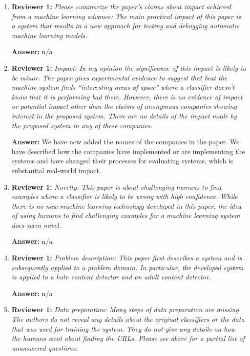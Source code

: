 \documentclass[letterpaper]{article}
\begin{document}
\begin{enumerate}
\item \textbf{Reviewer 1:} \emph{ Please summarize the paper's claims about impact achieved from a machine learning advance: The main practical impact of this paper is a system that results in a new approach for testing and debugging automatic machine learning models.}

\textbf{Answer:} n/a

\item \textbf{Reviewer 1:} \emph{Impact: In my opinion the significance of this impact is likely to be minor. The paper gives experimental evidence to suggest that beat the machine system finds ``interesting areas of space" where a classifier doesn't know that it is performing bad there. However, there is no evidence of impact  or potential impact other than the claims of anonymous companies showing interest in the proposed system. There are no details of the impact made by the proposed system in any of these companies.}

\textbf{Answer:} We have now added the names of the companies in the paper.  We have described how the companies have implemented or are implementing the systems and have changed their processes for evaluating systems, which is substantial real-world impact.

\item \textbf{Reviewer 1:} \emph{Novelty: This paper is about challenging humans to find examples where a classifier is likely to be wrong with high confidence. While there is no new machine learning technology developed in this paper, the idea of using humans to find challenging examples for a machine learning system does seem novel.}

\textbf{Answer:} n/a

\item \textbf{Reviewer 1:} \emph{Problem description: This paper first describes a system and is subsequently applied to a problem domain. In particular, the developed system is applied to a hate content detector and an adult content detector.}

\textbf{Answer:} n/a

\item \textbf{Reviewer 1:} \emph{Data preparation: Many steps of data preparation are missing. The authors do not reveal any details about the original classifiers or the data that was used for training the system. They do not give any details on how the humans went about finding the URLs.  Please see above for a partial list of unanswered questions.}


\end{enumerate}
\end{document}
